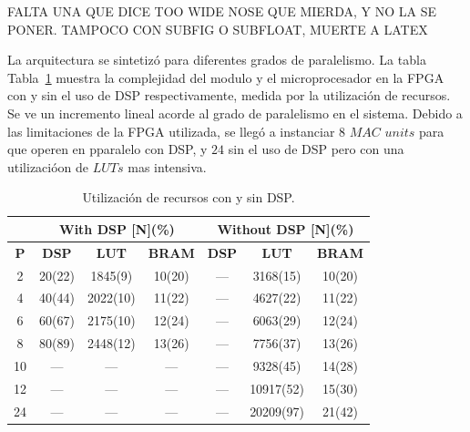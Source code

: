 \documentclass[a4paper]{article}
\begin{document}
FALTA UNA QUE DICE TOO WIDE NOSE QUE MIERDA, Y NO LA SE PONER. TAMPOCO CON SUBFIG O SUBFLOAT, MUERTE A LATEX
\bigskip
\bigskip
\bigskip
\bigskip
\bigskip
\bigskip
\bigskip
\bigskip
\bigskip
\bigskip
\bigskip
\bigskip
\bigskip
\bigskip
\bigskip
\bigskip
\bigskip
\bigskip
\bigskip





La arquitectura se sintetizó para diferentes grados de paralelismo.
La tabla Tabla~\ref{res_table} muestra la complejidad del modulo y el microprocesador en la FPGA
con y sin el uso de DSP respectivamente, medida por la utilización de recursos.
Se ve un incremento lineal acorde al grado de paralelismo en el sistema. Debido a las limitaciones de la FPGA utilizada,
se llegó a instanciar $8$ $MAC$ $units$ para que operen en pparalelo con DSP, y $24$ sin el uso de DSP pero con
una utilizacióon de $LUTs$ mas intensiva.

\begin{table}[H]
\renewcommand{\arraystretch}{1.3}
\caption{Utilización de recursos con y sin DSP.}
\label{res_table}
\centering
\begin{tabular}{|c|c|c|c|c|c|c|}
  \hline
  & \multicolumn{3}{c|}{\textbf{With DSP [N](\%)}} & \multicolumn{3}{c|}{\textbf{Without DSP [N](\%)}} \\ \hline
  \textbf{P}  & \textbf{DSP}            & \textbf{LUT}        & \textbf{BRAM}       & \textbf{DSP}         & \textbf{LUT}           & \textbf{BRAM}         \\ \hline
  2  & 20(22)         & 1845(9)    & 10(20)     & ---         & 3168(15)      & 10(20)         \\ \hline
  4  & 40(44)         & 2022(10)   & 11(22)     & ---         & 4627(22)      & 11(22)         \\ \hline
  6  & 60(67)         & 2175(10)   & 12(24)     & ---         & 6063(29)      & 12(24)         \\ \hline
  8  & 80(89)         & 2448(12)   & 13(26)     & ---         & 7756(37)      & 13(26)         \\ \hline
  10 & ---            & ---        & ---        & ---         & 9328(45)      & 14(28)         \\ \hline
  12 & ---            & ---        & ---        & ---         & 10917(52)     & 15(30)         \\ \hline
  24 & ---            & ---        & ---        & ---         & 20209(97)     & 21(42)         \\ \hline
\end{tabular}           
\end{table}
\end{document}

